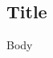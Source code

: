 \documentclass[../../main/main.tex]{subfiles}
\begin{document}
\subsection*{Title}

Body

\bibsub
\end{document}
